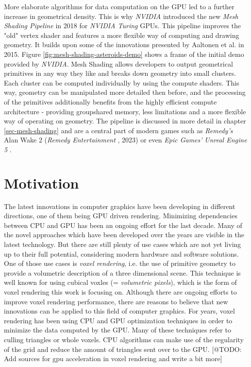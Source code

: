 \noindent
More elaborate algorithms for data computation on the \ac{GPU} led to a further increase in geometrical density.
This is why \emph{NVIDIA} introduced the new \emph{Mesh Shading Pipeline} in 2018 for \emph{NVIDIA Turing} \ac{GPU}s.
This pipeline improves the "old" vertex shader and features a more flexible way of computing and drawing geometry. 
It builds upon some of the innovations presented by Aaltonen et al.  \cite{Aaltonen2015} in 2015. Figure 
\ref{fig:mesh-shading-asteroids-demo} shows a frame of the initial demo provided by \emph{NVIDIA}. Mesh Shading 
allows developers to output geometrical primitives in any way they like and breaks down geometry into small clusters.
Each cluster can be computed individually by using the compute shaders. This way, geometry can be manipulated more 
detailed then before, and the processing of the primitives additionally benefits from the highly efficient compute 
architecture - providing groupshared memory, less limitations and a more flexible way of operating on geometry.
The pipeline is discussed in more detail in chapter \ref{sec-mesh-shading} and are a central part of modern games 
such as \emph{Remedy's} Alan Wake 2 (\emph{Remedy Entertainment} \cite{AlanWake22023}, 2023) or even 
\emph{Epic Games'} \emph{Unreal Engine 5} \cite{Karis2021}. 


\section{Motivation} \label{sec-motivation}

The latest innovations in computer graphics have been developing in different directions,
one of them being \ac{GPU} driven rendering. Minimizing dependencies between \ac{CPU} and \ac{GPU} 
has been an ongoing effort for the last decade. Many of the novel approaches which have been developed 
over the years are visible in the latest technology. But there are still plenty of use cases which are 
not yet living up to their full potential, considering modern hardware and software solutions.\\

\noindent 
One of those use cases is \emph{voxel rendering}, i.e. the use of primitive geometry to provide a 
volumetric description of a three dimensional scene. This technique is well known for using 
cubical voxles (= \emph{volumetric pixels}), which is the form of voxel rendering this work is 
focusing on. Although there are ongoing efforts to improve voxel rendering performance, there are 
reasons to believe that new innovations can be applied to this field of computer graphics. For years, 
voxel rendering has been using \ac{CPU} and \ac{GPU} optimization techniques in order to minimize 
the data computed by the \ac{GPU}. Many of these techniques refer to culling triangles or whole voxels. 
\ac{CPU} algorithms can make use of the regularity of the grid and reduce the amount of triangles sent 
over to the \ac{GPU}. [@TODO: Add sources for gpu acceleration in voxel rendering and write a bit more] \\

